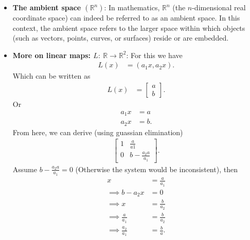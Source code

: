 \documentclass{report}
\begin{document}
\begin{itemize}
\begin{itemize}
                \end{itemize}
        \item \textbf{The ambient space $(\mathbb{R}^{n})$}: In mathematics, $\mathbb{R}^{n}$ (the $n$-dimensional real coordinate space) can indeed be referred to as an ambient space. In this context, the ambient space refers to the larger space within which objects (such as vectors, points, curves, or surfaces) reside or are embedded.
        \item \textbf{More on linear maps: $L:\ \mathbb{R} \to \mathbb{R}^{2} $}: For this we have
            \begin{align*}
                L(x) &= (a_{1}x, a_{2}x)
            .\end{align*}
            Which can be written as 
            \begin{align*}
                L(x) &=
                \begin{bmatrix}
                    a \\b
                \end{bmatrix}
            .\end{align*}
            Or 
            \begin{align*}
                a_{1}x &= a \\
                a_{2}x &= b
            .\end{align*}
            From here, we can derive (using guassian elimination)
            \begin{align*}
               \left[
               \begin{array}{ccc|c}
                   1 & \frac{a}{a1} \\
                   0 & b - \frac{a_{2}a}{a_{1}}
               \end{array} 
               \right] 
            .\end{align*}
            \bigbreak \noindent 
            Assume $b- \frac{a_{2}a}{a_{1}} = 0 $ (Otherwise the system would be inconsistent), then
            \begin{align*}
                x &= \frac{a}{a_{1}} \\
                \implies b -a_{2}x &= 0 \\
                \implies x &= \frac{b}{a_{2}} \\
                \implies \frac{a}{a_{1}} &= \frac{b}{a_{2}} \\
                \implies \frac{a_{2}}{a_{1}} &= \frac{b}{a}
            .\end{align*}

\end{itemize}
\end{document}
